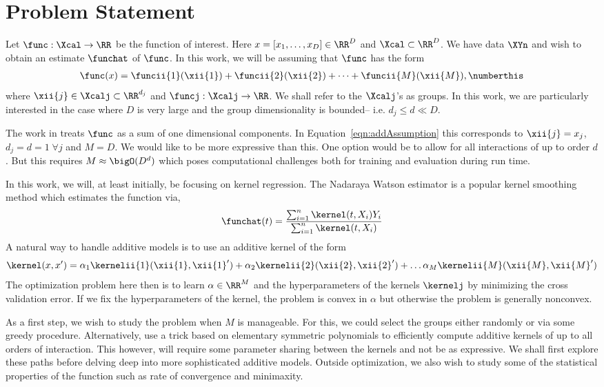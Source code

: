 
\section{Problem Statement}

Let $\func : \Xcal \rightarrow \RR$ be the function of interest. 
Here $x = [x_1, \dots, x_D] \in \RR^D$ and $\Xcal \subset \RR^D$.
We have data $\XYn$ and wish to obtain an estimate
$\funchat$ of $\func$.
In this work, we will be assuming that $\func$ has the form
\begin{align*}
\func(x) = \funcii{1}(\xii{1}) + \funcii{2}(\xii{2}) + \dots +
\funcii{M}(\xii{M}),
\numberthis
\label{eqn:addAssumption}
\end{align*}
where $\xii{j} \in \Xcalj \subset \RR^{d_j}$ and $\funcj:\Xcalj \rightarrow
\RR$. We shall refer to the $\Xcalj$'s as groups. 
In this work, we are particularly  interested in the case
where $D$ is very large and the group dimensionality is bounded-- i.e. $d_j \leq
d \ll D$. 

The work in \citet{hastie90gam} treats $\func$ as a sum of one
dimensional components. In Equation~\ref{eqn:addAssumption} this corresponds to
$\xii{j} = x_j$, $d_j = d =1\; \forall j$ and $M = D$. 
We would like to be more expressive than
this. One option would be to allow for all interactions of up to order $d$. But
this requires $M \approx \bigO(D^d)$ which poses computational challenges both
for training and evaluation during run time. 

In this work, we will, at least initially, be focusing on kernel regression. The Nadaraya
Watson estimator \cite{tsybakov08nonparametric} is a popular kernel smoothing method which
estimates the function via,
\[
\funchat(t) =  \frac{\sum_{i=1}^n\kernel(t,X_i) Y_i }{\sum_{i=1}^n \kernel(t,X_i)}
\]
A natural way to handle additive models is to use an additive kernel of the form
\[
\kernel(x,x') = 
\alpha_1\kernelii{1}(\xii{1}, {\xii{1}}') +
\alpha_2\kernelii{2}(\xii{2}, {\xii{2}}') + \dots
\alpha_M\kernelii{M}(\xii{M}, {\xii{M}}')
\]
The optimization problem here then is to learn 
$\alpha \in \RR^M$ and the hyperparameters of the kernels $\kernelj$ by minimizing the
cross validation error. If we fix the hyperparameters of the kernel, the problem
is convex in $\alpha$ but otherwise the problem is generally nonconvex.

As a first step, we wish to study the problem when $M$ is manageable. For this,
we could select the groups either randomly or via some greedy procedure.
Alternatively, \citep{duvenaud11additivegps} use a trick based on elementary
symmetric polynomials to efficiently compute additive kernels of up to all
orders of interaction. This however, will require some parameter sharing between
the kernels and not be as expressive. We shall first explore these paths before
delving deep into more sophisticated additive models.
Outside optimization, we also wish to study some of the statistical properties
of the function such as rate of convergence and minimaxity.

